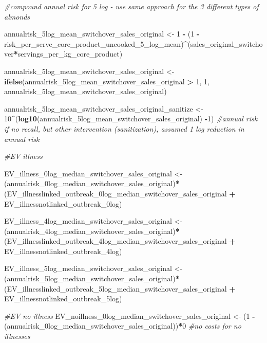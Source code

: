 \documentclass[
]{article}
\newenvironment{Shaded}{\begin{snugshade}}{\end{snugshade}}
\newcommand{\CommentTok}[1]{\textcolor[rgb]{0.56,0.35,0.01}{\textit{#1}}}
\newcommand{\DecValTok}[1]{\textcolor[rgb]{0.00,0.00,0.81}{#1}}
\newcommand{\FunctionTok}[1]{\textcolor[rgb]{0.13,0.29,0.53}{\textbf{#1}}}
\newcommand{\NormalTok}[1]{#1}
\newcommand{\OtherTok}[1]{\textcolor[rgb]{0.56,0.35,0.01}{#1}}
\newcommand{\SpecialCharTok}[1]{\textcolor[rgb]{0.81,0.36,0.00}{\textbf{#1}}}
\begin{document}
\begin{Shaded}
\begin{Highlighting}[]
\CommentTok{\#compound annual risk for 5 log {-} use same approach for the 3 different types of almonds}

\NormalTok{annualrisk\_5log\_mean\_switchover\_sales\_original }\OtherTok{\textless{}{-}} \DecValTok{1} \SpecialCharTok{{-}}\NormalTok{ (}\DecValTok{1} \SpecialCharTok{{-}}\NormalTok{ risk\_per\_serve\_core\_product\_uncooked\_5\_log\_mean)}\SpecialCharTok{\^{}}\NormalTok{(sales\_original\_switchover}\SpecialCharTok{*}\NormalTok{servings\_per\_kg\_core\_product)}

\NormalTok{annualrisk\_5log\_mean\_switchover\_sales\_original }\OtherTok{\textless{}{-}} \FunctionTok{ifelse}\NormalTok{(annualrisk\_5log\_mean\_switchover\_sales\_original }\SpecialCharTok{\textgreater{}} \DecValTok{1}\NormalTok{, }\DecValTok{1}\NormalTok{, annualrisk\_5log\_mean\_switchover\_sales\_original)}

\NormalTok{annualrisk\_5log\_mean\_switchover\_sales\_original\_sanitize }\OtherTok{\textless{}{-}} \DecValTok{10}\SpecialCharTok{\^{}}\NormalTok{(}\FunctionTok{log10}\NormalTok{(annualrisk\_5log\_mean\_switchover\_sales\_original) }\SpecialCharTok{{-}}\DecValTok{1}\NormalTok{) }\CommentTok{\#annual risk if no recall, but other intervention (sanitization), assumed 1 log reduction in annual risk}

\CommentTok{\#EV illness}

\NormalTok{EV\_illness\_0log\_median\_switchover\_sales\_original }\OtherTok{\textless{}{-}}\NormalTok{ (annualrisk\_0log\_median\_switchover\_sales\_original)}\SpecialCharTok{*}\NormalTok{(EV\_illnesslinked\_outbreak\_0log\_median\_switchover\_sales\_original }\SpecialCharTok{+}\NormalTok{ EV\_illnessnotlinked\_outbreak\_0log)}

\NormalTok{EV\_illness\_4log\_median\_switchover\_sales\_original }\OtherTok{\textless{}{-}}\NormalTok{ (annualrisk\_4log\_median\_switchover\_sales\_original)}\SpecialCharTok{*}\NormalTok{(EV\_illnesslinked\_outbreak\_4log\_median\_switchover\_sales\_original }\SpecialCharTok{+}\NormalTok{ EV\_illnessnotlinked\_outbreak\_4log)}

\NormalTok{EV\_illness\_5log\_median\_switchover\_sales\_original }\OtherTok{\textless{}{-}}\NormalTok{ (annualrisk\_5log\_median\_switchover\_sales\_original)}\SpecialCharTok{*}\NormalTok{(EV\_illnesslinked\_outbreak\_5log\_median\_switchover\_sales\_original }\SpecialCharTok{+}\NormalTok{ EV\_illnessnotlinked\_outbreak\_5log)}


\CommentTok{\#EV no illness}
\NormalTok{EV\_noillness\_0log\_median\_switchover\_sales\_original }\OtherTok{\textless{}{-}}\NormalTok{ (}\DecValTok{1} \SpecialCharTok{{-}}\NormalTok{ (annualrisk\_0log\_median\_switchover\_sales\_original))}\SpecialCharTok{*}\DecValTok{0} \CommentTok{\#no costs for no illnesses}


\end{Highlighting}
\end{Shaded}
\end{document}
